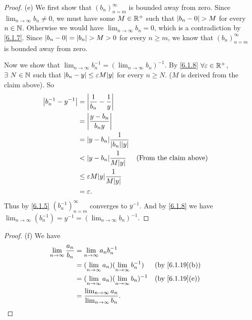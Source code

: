\begin{proof}{(e)}
  We first show that \((b_n)_{n = m}^\infty\) is bounded away from zero.
  Since \(\lim_{n \to \infty} b_n \neq 0\), we must have some \(M \in \mathbb{R}^+\) such that \(\left\lvert b_n - 0\right\rvert > M\) for every \(n \in \mathbb{N}\).
  Otherwise we would have \(\lim_{n \to \infty} b_n = 0\), which is a contradiction by \cref{6.1.7}.
  Since \(\left\lvert b_n - 0\right\rvert = \left\lvert b_n\right\rvert > M > 0\) for every \(n \geq m\), we know that \((b_n)_{n = m}^\infty\) is bounded away from zero.

  Now we show that \(\lim_{n \to \infty} b_n^{-1} = (\lim_{n \to \infty} b_n)^{-1}\).
  By \cref{6.1.8} \(\forall \varepsilon \in \mathbb{R}^+\), \(\exists\ N \in \mathbb{N}\) such that \(\abs{b_n - y} \leq \varepsilon M \abs{y}\) for every \(n \geq N\).
  (\(M\) is derived from the claim above).
  So
  \begin{align*}
    \abs{b_n^{-1} - y^{-1}} & = \abs{\dfrac{1}{b_n} - \dfrac{1}{y}}                                           \\
                            & = \abs{\dfrac{y - b_n}{b_n y}}                                                  \\
                            & = \abs{y - b_n}\dfrac{1}{\abs{b_n}\abs{y}}                                      \\
                            & < \abs{y - b_n}\dfrac{1}{M\abs{y}}           &  & \text{(From the claim above)} \\
                            & \leq \varepsilon M\abs{y}\dfrac{1}{M\abs{y}}                                    \\
                            & = \varepsilon.
  \end{align*}
  Thus by \cref{6.1.5} \((b_n^{-1})_{n = m}^\infty\) converges to \(y^{-1}\).
  And by \cref{6.1.8} we have \(\lim_{n \to \infty} (b_n^{-1}) = y^{-1} = (\lim_{n \to \infty} b_n)^{-1}\).
\end{proof}

\begin{proof}{(f)}
  We have
  \begin{align*}
    \lim_{n \to \infty} \dfrac{a_n}{b_n} & = \lim_{n \to \infty} a_n b_n^{-1}                                                            \\
                                         & = (\lim_{n \to \infty} a_n)(\lim_{n \to \infty} b_n^{-1})   &  & \text{(by \cref{6.1.19}(b))} \\
                                         & = (\lim_{n \to \infty} a_n)(\lim_{n \to \infty} b_n)^{-1}   &  & \text{(by \cref{6.1.19}(e))} \\
                                         & = \dfrac{\lim_{n \to \infty} a_n}{\lim_{n \to \infty} b_n}.
  \end{align*}
\end{proof}

